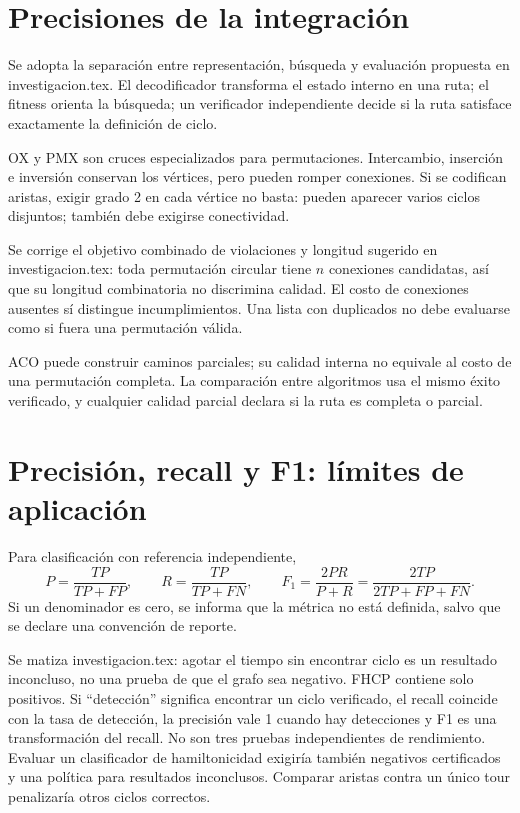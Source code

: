 \section{Precisiones de la integración}
Se adopta la separación entre representación, búsqueda y evaluación propuesta en investigacion.tex. El decodificador transforma el estado interno en una ruta; el fitness orienta la búsqueda; un verificador independiente decide si la ruta satisface exactamente la definición de ciclo.

OX y PMX son cruces especializados para permutaciones. Intercambio, inserción e inversión conservan los vértices, pero pueden romper conexiones. Si se codifican aristas, exigir grado 2 en cada vértice no basta: pueden aparecer varios ciclos disjuntos; también debe exigirse conectividad.\cite{aco4}

Se corrige el objetivo combinado de violaciones y longitud sugerido en investigacion.tex: toda permutación circular tiene $n$ conexiones candidatas, así que su longitud combinatoria no discrimina calidad. El costo de conexiones ausentes sí distingue incumplimientos. Una lista con duplicados no debe evaluarse como si fuera una permutación válida.

ACO puede construir caminos parciales; su calidad interna no equivale al costo de una permutación completa. La comparación entre algoritmos usa el mismo éxito verificado, y cualquier calidad parcial declara si la ruta es completa o parcial.

\section{Precisión, recall y F1: límites de aplicación}
Para clasificación con referencia independiente,
\[
P=\frac{TP}{TP+FP},\qquad R=\frac{TP}{TP+FN},\qquad
F_1=\frac{2PR}{P+R}=\frac{2TP}{2TP+FP+FN}.
\]
Si un denominador es cero, se informa que la métrica no está definida, salvo que se declare una convención de reporte.\cite{de9}

Se matiza investigacion.tex: agotar el tiempo sin encontrar ciclo es un resultado inconcluso, no una prueba de que el grafo sea negativo. FHCP contiene solo positivos. Si ``detección'' significa encontrar un ciclo verificado, el recall coincide con la tasa de detección, la precisión vale 1 cuando hay detecciones y F1 es una transformación del recall. No son tres pruebas independientes de rendimiento. Evaluar un clasificador de hamiltonicidad exigiría también negativos certificados y una política para resultados inconclusos. Comparar aristas contra un único tour penalizaría otros ciclos correctos.

